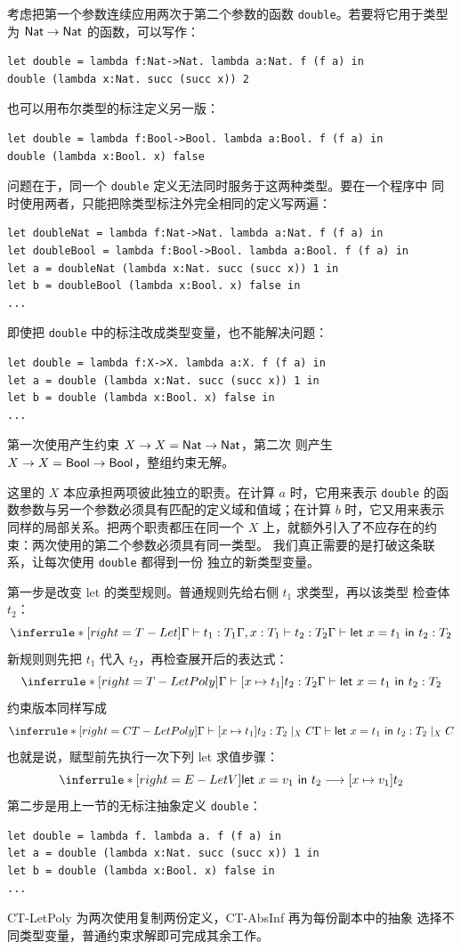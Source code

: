 考虑把第一个参数连续应用两次于第二个参数的函数
\texttt{double}。若要将它用于类型为 \(\mathsf{Nat}\to\mathsf{Nat}\)
的函数，可以写作：
\begin{lstlisting}
let double = lambda f:Nat->Nat. lambda a:Nat. f (f a) in
double (lambda x:Nat. succ (succ x)) 2
\end{lstlisting}
也可以用布尔类型的标注定义另一版：
\begin{lstlisting}
let double = lambda f:Bool->Bool. lambda a:Bool. f (f a) in
double (lambda x:Bool. x) false
\end{lstlisting}
问题在于，同一个 \texttt{double} 定义无法同时服务于这两种类型。要在一个程序中
同时使用两者，只能把除类型标注外完全相同的定义写两遍：
\begin{lstlisting}
let doubleNat = lambda f:Nat->Nat. lambda a:Nat. f (f a) in
let doubleBool = lambda f:Bool->Bool. lambda a:Bool. f (f a) in
let a = doubleNat (lambda x:Nat. succ (succ x)) 1 in
let b = doubleBool (lambda x:Bool. x) false in
...
\end{lstlisting}

即使把 \texttt{double} 中的标注改成类型变量，也不能解决问题：
\begin{lstlisting}
let double = lambda f:X->X. lambda a:X. f (f a) in
let a = double (lambda x:Nat. succ (succ x)) 1 in
let b = double (lambda x:Bool. x) false in
...
\end{lstlisting}
第一次使用产生约束 \(X\to X=\mathsf{Nat}\to\mathsf{Nat}\)，第二次
则产生 \(X\to X=\mathsf{Bool}\to\mathsf{Bool}\)，整组约束无解。

这里的 \(X\) 本应承担两项彼此独立的职责。在计算 \(a\) 时，它用来表示
\texttt{double} 的函数参数与另一个参数必须具有匹配的定义域和值域；在计算
\(b\) 时，它又用来表示同样的局部关系。把两个职责都压在同一个 \(X\)
上，就额外引入了不应存在的约束：两次使用的第二个参数必须具有同一类型。
我们真正需要的是打破这条联系，让每次使用 \texttt{double} 都得到一份
独立的新类型变量。

第一步是改变 let 的类型规则。普通规则先给右侧 \(t_1\) 求类型，再以该类型
检查体 \(t_2\)：
\[
\inferrule*[right=T-Let]
 {\Gamma\vdash t_1:T_1\\
  \Gamma,x:T_1\vdash t_2:T_2}
 {\Gamma\vdash\taplterm{let}\ x=t_1\ \taplterm{in}\ t_2:T_2}
\]
新规则则先把 \(t_1\) 代入 \(t_2\)，再检查展开后的表达式：
\[
\inferrule*[right=T-LetPoly]
 {\Gamma\vdash[x\mapsto t_1]t_2:T_2}
 {\Gamma\vdash\taplterm{let}\ x=t_1\ \taplterm{in}\ t_2:T_2}
\]
约束版本同样写成
\[
\inferrule*[right=CT-LetPoly]
 {\Gamma\vdash[x\mapsto t_1]t_2:T_2\mid_XC}
 {\Gamma\vdash\taplterm{let}\ x=t_1\ \taplterm{in}\ t_2:T_2\mid_XC}
\]
也就是说，赋型前先执行一次下列 let 求值步骤：
\[
\inferrule*[right=E-LetV]{ }
 {\taplterm{let}\ x=v_1\ \taplterm{in}\ t_2
  \longrightarrow[x\mapsto v_1]t_2}
\]
第二步是用上一节的无标注抽象定义
\texttt{double}：
\begin{lstlisting}
let double = lambda f. lambda a. f (f a) in
let a = double (lambda x:Nat. succ (succ x)) 1 in
let b = double (lambda x:Bool. x) false in
...
\end{lstlisting}
CT-LetPoly 为两次使用复制两份定义，CT-AbsInf 再为每份副本中的抽象
选择不同类型变量，普通约束求解即可完成其余工作。

